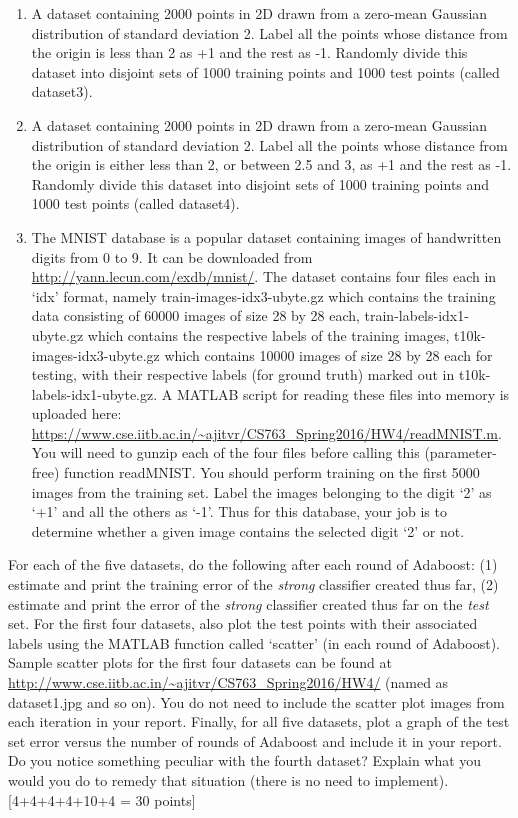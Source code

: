 \documentclass[11pt]{article}
\begin{document}
\begin{enumerate}
\begin{enumerate}
\item A dataset containing 2000 points in 2D drawn from a zero-mean Gaussian distribution of standard deviation 2. Label all the points whose distance from the origin is less than 2 as +1 and the rest as -1. Randomly divide this dataset into disjoint sets of 1000 training points and 1000 test points (called dataset3). 
\item A dataset containing 2000 points in 2D drawn from a zero-mean Gaussian distribution of standard deviation 2. Label all the points whose distance from the origin is either less than 2, or between 2.5 and 3, as +1 and the rest as -1. Randomly divide this dataset into disjoint sets of 1000 training points and 1000 test points (called dataset4). 
\item The MNIST database is a popular dataset containing images of handwritten digits from 0 to 9. It can be downloaded from \url{http://yann.lecun.com/exdb/mnist/}. The dataset contains four files each in `idx' format, namely train-images-idx3-ubyte.gz which contains the training data consisting of 60000 images of size 28 by 28 each, train-labels-idx1-ubyte.gz which contains the respective labels of the training images, t10k-images-idx3-ubyte.gz which contains 10000 images of size 28 by 28 each for testing, with their respective labels (for ground truth) marked out in t10k-labels-idx1-ubyte.gz. A MATLAB script for reading these files into memory is uploaded here: \url{https://www.cse.iitb.ac.in/~ajitvr/CS763_Spring2016/HW4/readMNIST.m}. You will need to gunzip each of the four files before calling this (parameter-free) function readMNIST. You should perform training on the first 5000 images from the training set. Label the images belonging to the digit `2' as `+1' and all the others as `-1'. Thus for this database, your job is to determine whether a given image contains the selected digit `2' or not.
\end{enumerate}
For each of the five datasets, do the following after each round of Adaboost: (1) estimate and print the training error of the \emph{strong} classifier created thus far, (2) estimate and print the error of the \emph{strong} classifier created thus far on the \emph{test} set. For the first four datasets, also plot the test points with their associated labels using the MATLAB function called `scatter' (in each round of Adaboost). Sample scatter plots for the first four datasets can be found at  \url{http://www.cse.iitb.ac.in/~ajitvr/CS763_Spring2016/HW4/} (named as dataset1.jpg and so on). You do not need to include the scatter plot images from each iteration in your report. Finally, for all five datasets, plot a graph of the test set error versus the number of rounds of Adaboost and include it in your report. Do you notice something peculiar with the fourth dataset? Explain what you would you do to remedy that situation (there is no need to implement). 
\textsf{[4+4+4+4+10+4 = 30 points]}


\end{enumerate}
\end{document}
